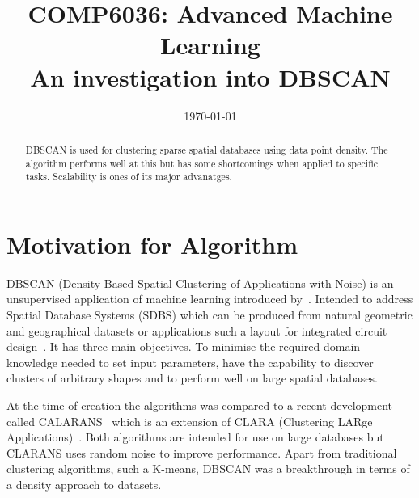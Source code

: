 \documentclass{ecsarticle}     %
\begin{document}
\frontmatter
\title      {COMP6036: Advanced Machine Learning\\
            An investigation into DBSCAN}
      
\addresses  {\deptname\\\univname}

\date       {\today}
\subject    {}
\keywords   {}
\maketitle



\begin{abstract}
DBSCAN is used for clustering sparse spatial databases using data point density.
The algorithm performs well at this but has some shortcomings when applied to specific tasks.
Scalability is ones of its major advanatges.
\end{abstract}

\mainmatter


\section{Motivation for Algorithm}

DBSCAN (Density-Based Spatial Clustering of Applications with Noise) is an unsupervised application of machine learning introduced by~\cite{ester96dbscan}.
Intended to address Spatial Database Systems (SDBS) which can be produced from natural geometric and geographical datasets or applications such a layout for integrated circuit design~\citep{guting94sdbs}.
It has three main objectives.
To minimise the required domain knowledge needed to set input parameters, have the capability to discover clusters of arbitrary shapes and to perform well on large spatial databases.

At the time of creation the algorithms was compared to a recent development called CALARANS~\citep{ng94clarans} which is an extension of CLARA (Clustering LARge Applications)~\citep{kaufman90clara}.
Both algorithms are intended for use on large databases but CLARANS uses random noise to improve performance.
Apart from traditional clustering algorithms, such a K-means, DBSCAN was a breakthrough in terms of a density approach to datasets.
\end{document}
